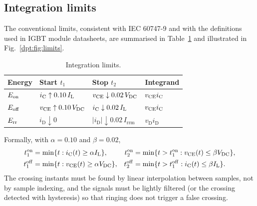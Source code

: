 \subsection{Integration limits}

The conventional limits, consistent with IEC 60747-9 and with the definitions used in
IGBT module datasheets, are summarised in Table~\ref{dpt:tab:limits} and illustrated in
Fig.~\ref{dpt:fig:limits}.

\begin{table}[htbp]
\centering
\caption{Integration limits.}
\label{dpt:tab:limits}
\begin{tabular}{llll}
\toprule
Energy & Start $t_1$ & Stop $t_2$ & Integrand \\
\midrule
$E_{\mathrm{on}}$  & $i_{\mathrm{C}} \uparrow 0.10\,I_{\mathrm{L}}$ & $v_{\mathrm{CE}} \downarrow 0.02\,V_{\mathrm{DC}}$ & $v_{\mathrm{CE}} i_{\mathrm{C}}$ \\
$E_{\mathrm{off}}$ & $v_{\mathrm{CE}} \uparrow 0.10\,V_{\mathrm{DC}}$ & $i_{\mathrm{C}} \downarrow 0.02\,I_{\mathrm{L}}$ & $v_{\mathrm{CE}} i_{\mathrm{C}}$ \\
$E_{\mathrm{rr}}$  & $i_{\mathrm{D}} \downarrow 0$ & $|i_{\mathrm{D}}| \downarrow 0.02\,I_{\mathrm{rrm}}$ & $v_{\mathrm{D}} i_{\mathrm{D}}$ \\
\bottomrule
\end{tabular}
\end{table}

Formally, with $\alpha=0.10$ and $\beta=0.02$,
\begin{align}
t_{1}^{\mathrm{on}}  &= \min\{t: i_{\mathrm{C}}(t)\ge \alpha I_{\mathrm{L}}\}, &
t_{2}^{\mathrm{on}}  &= \min\{t>t_1^{\mathrm{on}}: v_{\mathrm{CE}}(t)\le \beta V_{\mathrm{DC}}\}, \\
t_{1}^{\mathrm{off}} &= \min\{t: v_{\mathrm{CE}}(t)\ge \alpha V_{\mathrm{DC}}\}, &
t_{2}^{\mathrm{off}} &= \min\{t>t_1^{\mathrm{off}}: i_{\mathrm{C}}(t)\le \beta I_{\mathrm{L}}\}.
\end{align}
The crossing instants must be found by linear interpolation between samples, not by
sample indexing, and the signals must be lightly filtered (or the crossing detected with
hysteresis) so that ringing does not trigger a false crossing.

